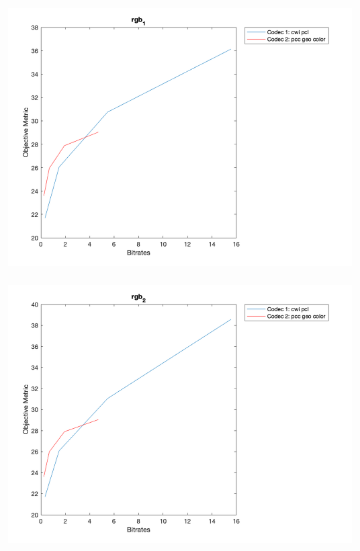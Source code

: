 \documentclass{article}
\begin{document}
\begin{figure}
 \ContinuedFloat

    \begin{subfigure}[b]{0.65\textwidth}
    \includegraphics[width=\textwidth]{Figures/task2/phil_rgb1.png}
    \end{subfigure}
    
    \begin{subfigure}[b]{0.65\textwidth}
    \includegraphics[width=\textwidth]{Figures/task2/phil_rgb2.png}
    \end{subfigure}
    

\end{figure}
\end{document}
